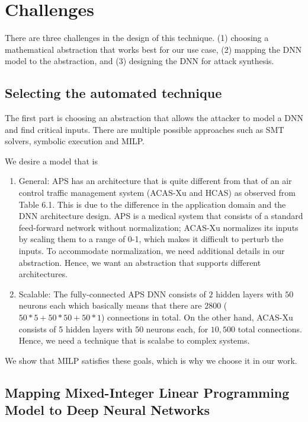\section{Challenges}
There are three challenges in the design of this technique. 
(1) choosing a mathematical abstraction that works best for our use case, 
(2) mapping the \ac{DNN}  model to the abstraction, and 
(3) designing the \ac{DNN}  for attack synthesis.  


\subsection{Selecting  the automated technique}
The first part is choosing an abstraction that allows the attacker to model a DNN and find critical inputs. 
There are multiple possible approaches such as \ac*{SMT} solvers, symbolic execution and \ac*{MILP}.

We desire a model that is
\begin{enumerate}
	\item General: \ac{APS} has an architecture that %
	is quite different from that of an air control traffic management system (\ac{ACAS-Xu} and \ac{HCAS}) as observed from Table 6.1.
	This is due to the difference in the application domain and the \ac{DNN} architecture design. 
	\ac{APS} is a medical system that consists of a standard feed-forward network without normalization; \ac{ACAS-Xu} normalizes its inputs by scaling them to a range of {0-1}, which makes it difficult to perturb the inputs. 
	To accommodate normalization, we need additional details in our abstraction.  
	Hence, we want an abstraction that supports different architectures. 
	\item Scalable: The fully-connected \ac{APS} \ac{DNN} consists of $2$ hidden layers with $50$ neurons each which basically means that there are $2800$ ($50*5 + 50*50 + 50*1$) connections in total.
	On the other hand, \ac{ACAS-Xu} consists of 5 hidden layers with 50 neurons each, for $10,500$ total connections. 
	Hence, we need a technique that is scalabe to complex systems. 
	
\end{enumerate}

 We show that \ac{MILP} satisfies these goals, which is why we choose it in our work. %


\subsection{ Mapping  Mixed-Integer Linear Programming Model to Deep Neural Networks}

